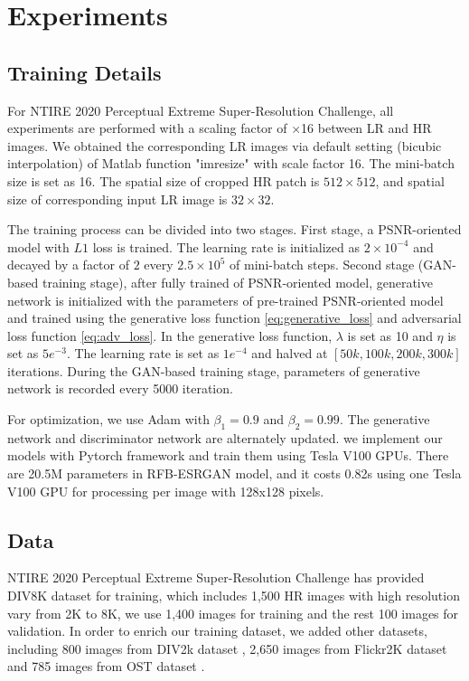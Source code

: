 \documentclass[10pt,twocolumn,letterpaper]{article}
\begin{document}
\section{Experiments}
\subsection{Training Details}
For NTIRE 2020 Perceptual Extreme Super-Resolution Challenge, all experiments are performed with a scaling factor of $\times$16 between LR and HR images. We obtained the corresponding LR images via default setting (bicubic interpolation) of Matlab function "imresize" with scale factor 16. The mini-batch size is set as 16. The spatial size of cropped HR patch is $512 \times 512$, and spatial size of corresponding input LR image is $32 \times 32$. 

The training process can be divided into two stages. First stage, a PSNR-oriented model with $L1$ loss is trained. The learning rate is initialized as $2 \times 10^{-4}$ and decayed by a factor of $2$ every $2.5 \times 10^5$ of mini-batch steps. Second stage (GAN-based training stage), after fully trained of PSNR-oriented model, generative network is initialized with the parameters of pre-trained PSNR-oriented model and trained using the generative loss function \eqref{eq:generative_loss} and adversarial loss function \eqref{eq:adv_loss}. In the generative loss function, $\lambda$ is set as 10 and $\eta$ is set as $5e^{-3}$. The learning rate is set as $1e^{-4}$ and halved at $[50k,100k,200k,300k]$ iterations. During the GAN-based training stage, parameters of generative network is recorded every 5000 iteration. 

For optimization, we use Adam \cite{kingma2014adam} with $\beta_1=0.9$ and $\beta_2=0.99$. The generative network and discriminator network are alternately updated. we implement our models with Pytorch framework and train them using Tesla V100 GPUs. There are 20.5M parameters in RFB-ESRGAN model, and it costs 0.82s using one Tesla V100 GPU for processing per image with 128x128 pixels.

\subsection{Data}
NTIRE 2020 Perceptual Extreme Super-Resolution Challenge has provided DIV8K dataset \cite{gu2019div8k} for training, which includes 1,500 HR images with high resolution vary from 2K to 8K, we use 1,400 images for training and the rest 100 images for validation. In order to enrich our training dataset, we added other datasets, including 800 images from DIV2k dataset \cite{agustsson2017ntire}, 2,650 images from Flickr2K \cite{timofte2017ntire} dataset and 785 images from OST dataset \cite{wang2018recovering}.
\end{document}
